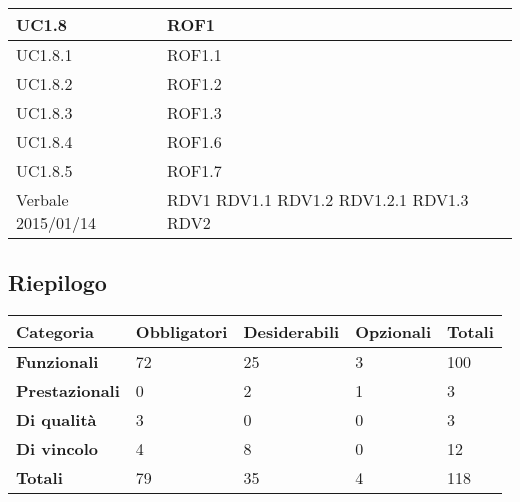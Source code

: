 \begin{center}
\begin{longtable}{| p{4cm} | p{4cm} |}
		\hline
		UC1.8  &  ROF1 \\
		\hline
		UC1.8.1  &  ROF1.1 \\
		\hline
		UC1.8.2  &  ROF1.2 \\
		\hline
		UC1.8.3  &  ROF1.3 \\
		\hline
		UC1.8.4  &  ROF1.6 \\
		\hline
		UC1.8.5  &  ROF1.7 \\
		\hline
		Verbale 2015/01/14  &  RDV1 \newline RDV1.1 \newline RDV1.2 \newline RDV1.2.1 \newline RDV1.3 \newline RDV2 \\
		\hline

	\end{longtable}
	\egroup
	\end{center}


\subsection{Riepilogo}

\begin{center}

	\def\arraystretch{1.5}
	\bgroup
	\begin{longtable}{| p{2.7cm} | p{2.4cm} | p{2.4cm} | p{2.4cm} | p{1.7cm} |}

		\hline
		\textbf{Categoria} & \textbf{Obbligatori} & \textbf{Desiderabili} & \textbf{Opzionali} & \textbf{Totali} \\
		\hline

		\textbf{Funzionali}  & 72 & 25 & 3 & 100\\
		\hline
		\textbf{Prestazionali} & 0 & 2 & 1 & 3\\
		\hline
		\textbf{Di qualità} & 3 & 0 & 0 & 3\\
		\hline
		\textbf{Di vincolo} & 4 & 8 & 0 & 12\\
		\hline
		\textbf{Totali}  & 79 & 35 & 4 & 118\\
		\hline
	\end{longtable}
	\egroup
\end{center}



